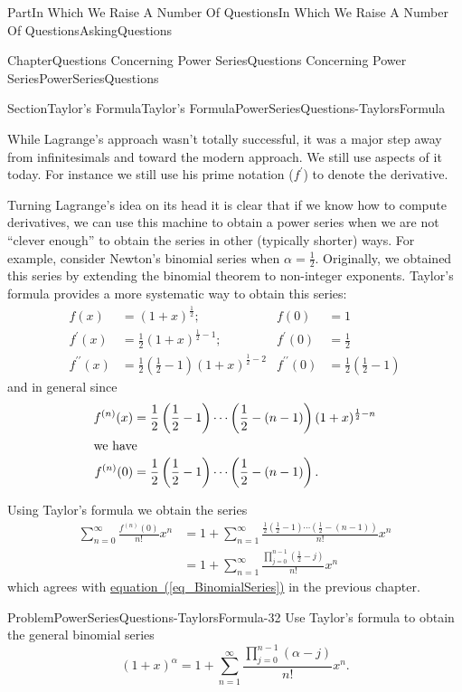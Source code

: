 \documentclass[oneside,10pt,]{book}
\newcommand{\xreffont}{\relax}
\numberwithin{equation}{part}
\newcommand{\amp}{&}
\begin{document}
\begin{partptx}{Part}{In Which We Raise A Number Of Questions}{}{In Which We Raise A Number Of Questions}{}{}{AskingQuestions}
\begin{chapterptx}{Chapter}{Questions Concerning Power Series}{}{Questions Concerning Power Series}{}{}{PowerSeriesQuestions}
\begin{sectionptx}{Section}{Taylor's Formula}{}{Taylor's Formula}{}{}{PowerSeriesQuestions-TaylorsFormula}
\par
While Lagrange's approach wasn't totally successful, it was a major step away from infinitesimals and toward the modern approach.  We still use aspects of it today.  For instance we still use his prime notation (\(f^\prime\)) to denote the derivative.%
\par
Turning Lagrange's idea on its head it is clear that if we know how to compute derivatives, we can use this machine to obtain a power series when we are not ``clever enough'' to obtain the series in other (typically shorter) ways. For example, consider Newton's binomial series when \(\alpha=\frac{1}{2}\). Originally, we obtained this series by extending the binomial theorem to non-integer exponents. Taylor's formula provides a more systematic way to obtain this series:%
\begin{align*}
f(x)\amp =(1+x)^{\frac{1}{2}};\amp f(0)\amp =1\\
f^\prime(x)\amp =\frac{1}{2}(1+x)^{\frac{1}{2}-1};\amp  f^\prime(0)\amp =\frac{1}{2}\\
f^{\prime\prime}(x)\amp =\frac{1}{2}\left(\frac{1}{2}-1\right)(1+x)^{\frac{1}{2}-2}\amp f^{\prime\prime}(0)\amp =\frac{1}{2}\left(\frac{1}{2}-1\right)
\end{align*}
and in general since%
\begin{align*}
f^{(n)}(x)\amp =\frac{1}{2}\left(\frac{1}{2}-1\right)\cdots\left(\frac{1}{2}-(n-1)\right)(1+x)^{\frac{1}{2}-n}\\
\intertext{we have}
f^{(n)}(0)\amp =\frac{1}{2}\left(\frac{1}{2}-1\right)\cdots\left(\frac{1}{2}-(n-1)\right)\text{.}
\end{align*}
%
\par
Using Taylor's formula we obtain the series%
\begin{align*}
\sum_{n=0}^\infty\frac{f^{(n)}(0)}{n!}x^n \amp{}= 1+\sum_{n=1}^\infty\frac{\frac{1}{2}\left(\frac{1}{2}-1\right)\cdots\left( \frac{1}{2}-(n-1)\right)}{n!}x^n\\
\amp{}= 1+\sum_{n=1}^\infty\frac{\prod_{j=0}^{n-1}\left(\frac{1}{2}-j\right)}{n!}x^n
\end{align*}
which agrees with \hyperref[eq_BinomialSeries]{equation~({\xreffont\ref{eq_BinomialSeries}})} in the previous chapter.%
\begin{problem}{Problem}{}{PowerSeriesQuestions-TaylorsFormula-32}%
 Use Taylor's formula to obtain the general binomial series%
\begin{equation*}
(1+x)^\alpha=1+\sum_{n=1}^\infty\frac{\prod_{j=0}^{n-1}\left(\alpha-j\right)}{n!}x^n.{}

\end{equation*}
\end{problem}
\end{sectionptx}
\end{chapterptx}
\end{partptx}
\end{document}
